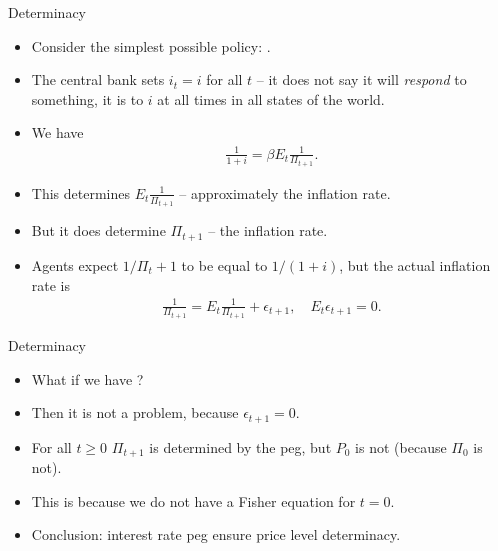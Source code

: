 \documentclass[11pt,xcolor={dvipsnames},aspectratio=159,hyperref={pdftex,pdfpagemode=UseNone,hidelinks,pdfdisplaydoctitle=true},usepdftitle=false]{beamer}
\begin{document}
\begin{frame}{Determinacy}
    \begin{itemize}
            \item Consider the simplest possible policy: .
            \item The central bank sets $i_t = i$ for all $t$ -- it does not say it will \emph{respond} to something, it is  to $i$ at all times in all states of the world.
            \item We have \begin{align*}
                \frac{1}{1+i} = \beta  E_t\frac{1}{\Pi_{t+1}}.
            \end{align*}
            \item This determines $E_t\frac{1}{\Pi_{t+1}}$  -- approximately the  inflation rate.
            \item But it does  determine $\Pi_{t+1}$ -- the  inflation rate.  
            \item Agents expect $1\slash\Pi_t+1$ to be equal to $1/(1+i)$, but the actual inflation rate is \begin{align*}
            \frac{1}{\Pi_{t+1}} = E_t\frac{1}{\Pi_{t+1}} + \epsilon_{t+1},\quad E_t\epsilon_{t+1} = 0. 
        \end{align*}
   
        \end{itemize}
    \end{frame}

    \begin{frame}{Determinacy}
        \begin{itemize}
                \item What if we have ? 
                \item Then it is not a problem, because $\epsilon_{t+1} = 0$. 
                \item For all $t\geq0$ $\Pi_{t+1}$ is determined by the peg, but $P_0$ is not (because $\Pi_0$ is not).
                \item This is because we do not have a Fisher equation for $t=0$.
                \item Conclusion: interest rate peg  ensure price level determinacy. 
            \end{itemize}
        \end{frame}
\end{document}
